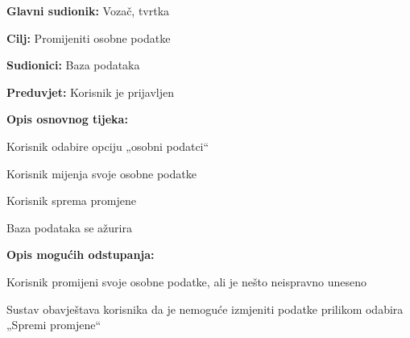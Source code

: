 					\noindent {}
					\begin{packed_item}
						
						\item  \textbf{Glavni sudionik: } Vozač, tvrtka
						\item  \textbf{Cilj:} Promijeniti osobne podatke
						\item  \textbf{Sudionici:} Baza podataka
						\item  \textbf{Preduvjet:} Korisnik je prijavljen
						\item  \textbf{Opis osnovnog tijeka:}
						
						\item[] \begin{packed_enum}
							\item Korisnik odabire opciju „osobni podatci“
							\item Korisnik mijenja svoje osobne podatke
							\item Korisnik sprema promjene
							\item Baza podataka se ažurira
						\end{packed_enum}
						
						\item  \textbf{Opis mogućih odstupanja:}
						
						\item[] \begin{packed_item}
							
							\item[2.a]  Korisnik promijeni svoje osobne podatke, ali je nešto neispravno uneseno
							\item[] \begin{packed_enum}
								
								\item Sustav obavještava korisnika da je nemoguće izmjeniti podatke prilikom odabira „Spremi promjene“
								
							\end{packed_enum}
						\end{packed_item}
					\end{packed_item}
					\noindent {}
